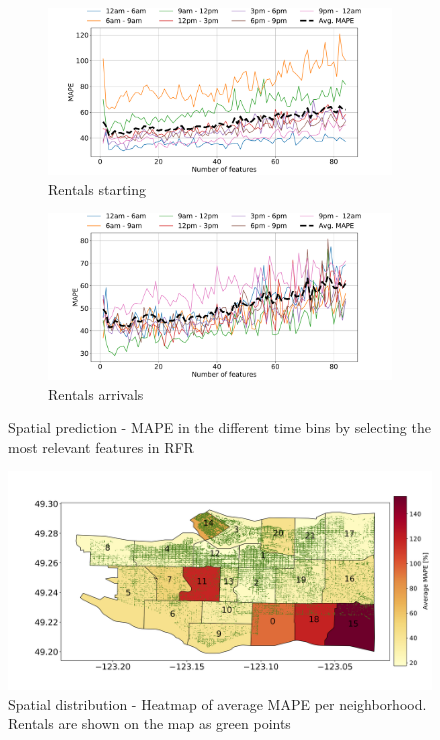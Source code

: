 \begin{figure}
    \begin{center}
         \begin{subfigure}{0.65\textwidth}
             \includegraphics[width=\columnwidth]{figures/spatial_analyses/LC_rfr_True_start.pdf}
             \caption{Rentals starting
             \vspace{0.5cm}}
             \label{fig:rfr_start_err_lc}
         \end{subfigure}
         \begin{subfigure}{0.65\textwidth}
             \includegraphics[width=\columnwidth]{figures/spatial_analyses/LC_rfr_True_final.pdf}
             \caption{Rentals arrivals}
             \label{fig:rfr_final_err_lc}
         \end{subfigure}         
 	\caption{Spatial prediction - MAPE in the different time bins by selecting the most relevant features in RFR}
    \label{fig:reg_err_perc_LC}
\end{center}
\end{figure}


\begin{figure}
    \begin{center}
        \includegraphics[width=0.7\columnwidth]{figures/spatial_analyses/error_distirbution_map.png}
     	\caption{Spatial distribution - Heatmap of average MAPE per neighborhood. Rentals are shown on the map as green points}
        \label{fig:error_distributiion}
    \end{center}
\end{figure}